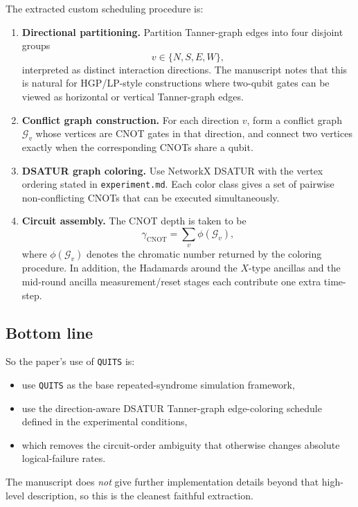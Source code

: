 \documentclass[11pt]{article}
\begin{document}
The extracted custom scheduling procedure is:
\begin{enumerate}[label=(\arabic*)]
    \item \textbf{Directional partitioning.} Partition Tanner-graph edges into four disjoint groups
    \[
    v\in\{N,S,E,W\},
    \]
    interpreted as distinct interaction directions. The manuscript notes that this is natural for HGP/LP-style constructions where two-qubit gates can be viewed as horizontal or vertical Tanner-graph edges.

    \item \textbf{Conflict graph construction.} For each direction $v$, form a conflict graph $\mathcal G_v$ whose vertices are CNOT gates in that direction, and connect two vertices exactly when the corresponding CNOTs share a qubit.

    \item \textbf{DSATUR graph coloring.} Use NetworkX DSATUR with the vertex ordering stated in \texttt{experiment.md}. Each color class gives a set of pairwise non-conflicting CNOTs that can be executed simultaneously.

    \item \textbf{Circuit assembly.} The CNOT depth is taken to be
    \[
    \gamma_{\mathrm{CNOT}} = \sum_v \phi(\mathcal G_v),
    \]
    where $\phi(\mathcal G_v)$ denotes the chromatic number returned by the coloring procedure. In addition, the Hadamards around the $X$-type ancillas and the mid-round ancilla measurement/reset stages each contribute one extra time-step.
\end{enumerate}

\subsection{Bottom line}
So the paper's use of \texttt{QUITS} is:
\begin{itemize}
    \item use \texttt{QUITS} as the base repeated-syndrome simulation framework,
    \item use the direction-aware DSATUR Tanner-graph edge-coloring schedule defined in the experimental conditions,
    \item which removes the circuit-order ambiguity that otherwise changes absolute logical-failure rates.
\end{itemize}
The manuscript does \emph{not} give further implementation details beyond that high-level description, so this is the cleanest faithful extraction.
\end{document}
